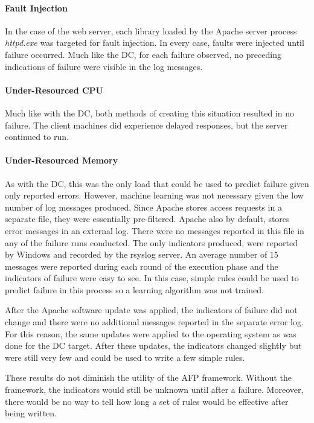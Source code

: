 \paragraph{Fault Injection}
In the case of the web server, each library loaded by the Apache server process
\emph{httpd.exe} was targeted for fault injection.  In every case, faults were
injected until failure occurred.  Much like the \ac{DC}, for each failure
observed, no preceding indications of failure were visible in the log messages.

\paragraph{Under-Resourced CPU}
Much like with the \ac{DC}, both methods of creating this situation resulted in
no failure.  The client machines did experience delayed responses, but the
server continued to run.

\paragraph{Under-Resourced Memory}
As with the \ac{DC}, this was the only load that could be used to predict
failure given only reported errors.  However, machine learning was not
necessary given the low number of log messages produced.  Since Apache stores
access requests in a separate file, they were essentially pre-filtered.  Apache
also by default, stores error messages in an external log.  There were no
messages reported in this file in any of the failure runs conducted.  The only
indicators produced, were reported by Windows and recorded by the rsyslog
server.  An average number of $15$ messages were reported during each round of
the execution phase and the indicators of failure were easy to see.  In this
case, simple rules could be used to predict failure in this process so a
learning algorithm was not trained.  

After the Apache software update was applied, the indicators of failure did not
change and there were no additional messages reported in the separate error
log.  For this reason, the same updates were applied to the operating system as
was done for the \ac{DC} target.  After these updates, the indicators changed
slightly but were still very few and could be used to write a few simple rules.

These results do not diminish the utility of the \ac{AFP} framework.  Without
the framework, the indicators would still be unknown until after a failure.
Moreover, there would be no way to tell how long a set of rules would be
effective after being written.

